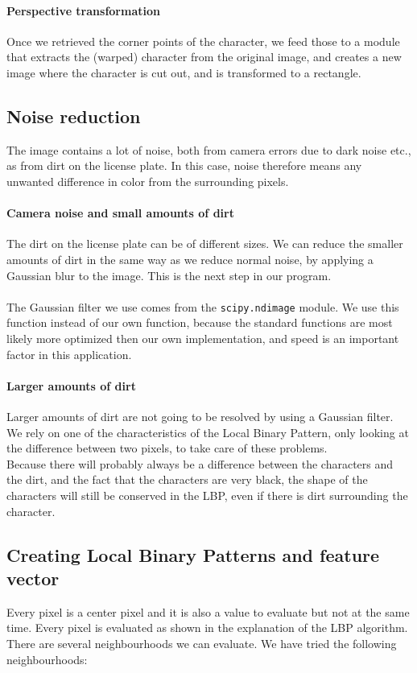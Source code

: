 \documentclass[a4paper]{article}
\begin{document}
\paragraph*{Perspective transformation}
Once we retrieved the corner points of the character, we feed those to a
module that extracts the (warped) character from the original image, and
creates a new image where the character is cut out, and is transformed to a
rectangle.

\subsection{Noise reduction}

The image contains a lot of noise, both from camera errors due to dark noise 
etc., as from dirt on the license plate. In this case, noise therefore means 
any unwanted difference in color from the surrounding pixels.

\paragraph*{Camera noise and small amounts of dirt}
The dirt on the license plate can be of different sizes. We can reduce the 
smaller amounts of dirt in the same way as we reduce normal noise, by applying
a Gaussian blur to the image. This is the next step in our program.\\
\\
The Gaussian filter we use comes from the \texttt{scipy.ndimage} module. We use
this function instead of our own function, because the standard functions are
most likely more optimized then our own implementation, and speed is an
important factor in this application.

\paragraph*{Larger amounts of dirt}
Larger amounts of dirt are not going to be resolved by using a Gaussian filter.
We rely on one of the characteristics of the Local Binary Pattern, only looking
at the difference between two pixels, to take care of these problems.\\
Because there will probably always be a difference between the characters and
the dirt, and the fact that the characters are very black, the shape of the
characters will still be conserved in the LBP, even if there is dirt
surrounding the character.

\subsection{Creating Local Binary Patterns and feature vector}
Every pixel is a center pixel and it is also a value to evaluate but not at the 
same time. Every pixel is evaluated as shown in the explanation
of the LBP algorithm. There are several neighbourhoods we can evaluate. We have
tried the following neighbourhoods:
\end{document}
